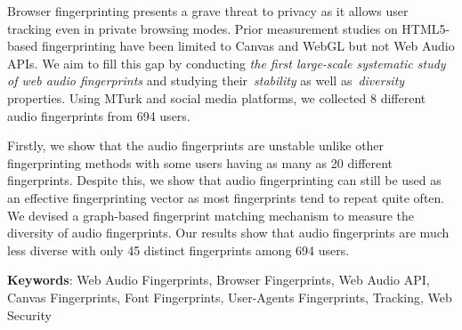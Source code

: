 Browser fingerprinting presents a grave threat to privacy as it allows user tracking even in private browsing modes. Prior measurement studies on HTML5-based fingerprinting have been limited to Canvas and WebGL but not Web Audio APIs. We aim to fill this gap by conducting \emph{the first large-scale systematic study of web audio fingerprints} and studying their~\emph{stability} as well as~\emph{diversity} properties. Using MTurk and social media platforms, we collected 8 different audio fingerprints from 694 users.

Firstly, we show that the audio fingerprints are unstable unlike other fingerprinting methods with some users having as many as 20 different fingerprints. Despite this, we show that audio fingerprinting can still be used as an effective fingerprinting vector as most fingerprints tend to repeat quite often. We devised a graph-based fingerprint matching mechanism to measure the diversity of audio fingerprints. Our results show that audio fingerprints are much less diverse with only 45 distinct fingerprints among 694 users.



\textbf{Keywords}: Web Audio Fingerprints, Browser Fingerprints, Web Audio API, Canvas Fingerprints, Font Fingerprints, User-Agents Fingerprints, Tracking, Web Security
\pagebreak{}
